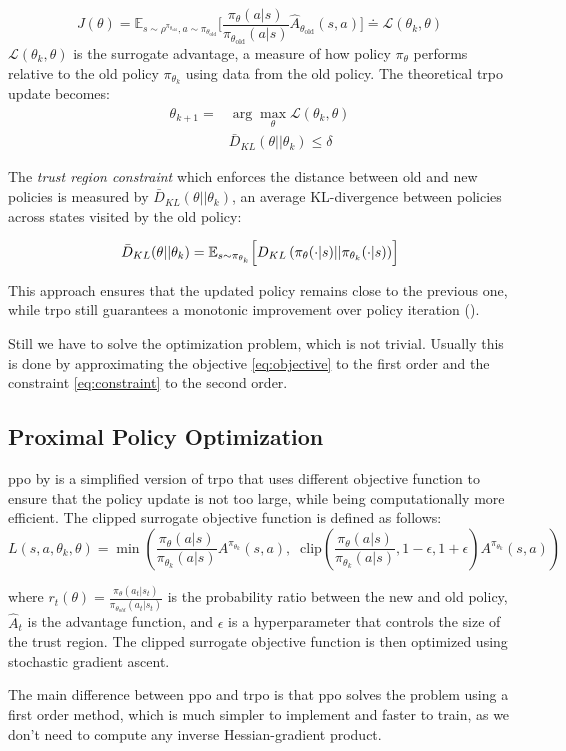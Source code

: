 $$J(\theta) = \mathbb{E}_{s \sim \rho^{\pi_{\theta_\text{old}}}, a \sim \pi_{\theta_\text{old}}} \big[ \frac{\pi_\theta(a \vert s)}{\pi_{\theta_\text{old}}(a \vert s)} \hat{A}_{\theta_\text{old}}(s, a) \big] \doteq {\mathcal L}(\theta_k, \theta)$$
${\mathcal L}(\theta_k, \theta)$ is the surrogate advantage, a measure of how policy $\pi_{\theta}$ performs relative to the old policy $\pi_{\theta_k}$ using data from the old policy.
The theoretical \gls{trpo} update becomes:
\begin{align}
    \theta_{k+1} =& \arg \max_{\theta}{\mathcal L}(\theta_k, \theta)  \label{eq:objective}\\ 
    & \bar{D}_{KL}(\theta || \theta_k) \leq \delta \label{eq:constraint}
\end{align}

The \emph{trust region constraint} which enforces the distance between old and new policies is 
measured by $\bar{D}_{KL}(\theta || \theta_k)$, an average KL-divergence between policies across 
states visited by the old policy:

$$\bar{D}_{KL}(\theta || \theta_k) = \mathbb{E}_{s \sim \pi_{\theta_k}}\Bigl[D_{KL}\left(\pi_{\theta}(\cdot|s) || \pi_{\theta_k} (\cdot|s) \right)\Bigr]$$

This approach ensures that the updated policy remains close to the previous one, 
while \gls{trpo} still guarantees a monotonic improvement over policy iteration (\cite{schulman2017trustregionpolicyoptimization}).

Still we have to solve the optimization problem, which is not trivial. Usually this is done by 
approximating the objective \ref{eq:objective} to the first order and the constraint \ref{eq:constraint} to the second order.

\subsection{Proximal Policy Optimization}
\gls{ppo} by \cite{schulman2017proximalpolicyoptimizationalgorithms} is a simplified version of \gls{trpo} that 
uses different objective function to ensure that the policy update is not too large, while being 
computationally more efficient. 
The clipped surrogate objective function is defined as follows:
$$L(s,a,\theta_k,\theta) = \min\left( \frac{\pi_{\theta}(a|s)}{\pi_{\theta_k}(a|s)} A^{\pi_{\theta_k}}(s,a), \;\; \text{clip}\left(\frac{\pi_{\theta}(a|s)}{\pi_{\theta_k}(a|s)}, 1 - \epsilon, 1+\epsilon \right) A^{\pi_{\theta_k}}(s,a) \right)$$

where $r_t(\theta) = \frac{\pi_\theta(a_t|s_t)}{\pi_{\theta_{old}}(a_t|s_t)}$ is the probability ratio 
between the new and old policy, $\hat{A}_t$ is the advantage function, and $\epsilon$ is a 
hyperparameter that controls the size of the trust region. The clipped surrogate objective function 
is then optimized using stochastic gradient ascent.

The main difference between \gls{ppo} and \gls{trpo} is
that \gls{ppo} solves the problem using a first order method, which is much
simpler to implement and faster to train, as we don't need to compute any
inverse Hessian-gradient product. 
